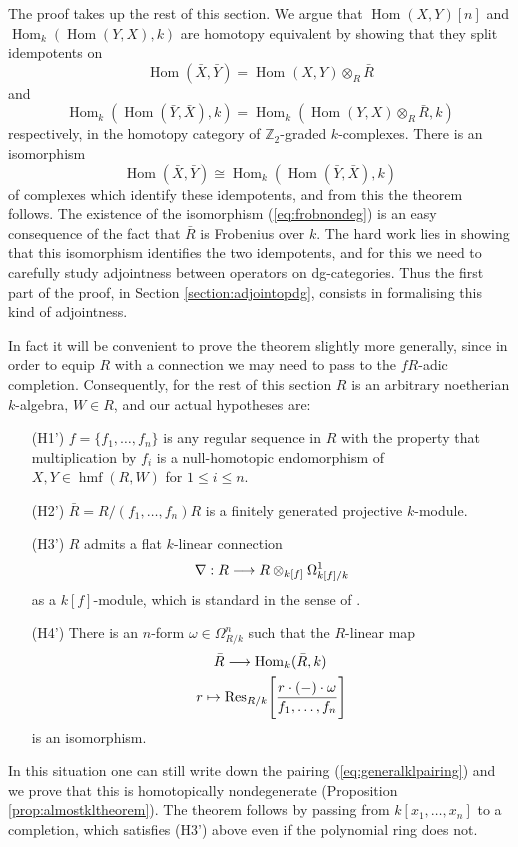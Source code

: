 \documentclass{compositio}
\theoremstyle{definition}
\newtheorem{remark}[theorem]{Remark}
\numberwithin{equation}{section}
\newcommand{\Ress}[1]{\res_{#1}\!}
\def\res{\operatorname{Res}}
\def\Hom{\operatorname{Hom}}
\DeclareMathOperator{\hmf}{hmf}
\begin{document}

The proof takes up the rest of this section. We argue that $\Hom(X,Y)[n]$ and $\Hom_k(\Hom(Y,X),k)$ are homotopy equivalent by showing that they split idempotents on
\[
\Hom(\bar{X},\bar{Y}) = \Hom(X,Y) \otimes_R \bar{R}
\]
and
\[
\Hom_k( \Hom(\bar{Y}, \bar{X}), k) = \Hom_k( \Hom(Y,X) \otimes_R \bar{R}, k )
\]
respectively, in the homotopy category of $\mathbb{Z}_2$-graded $k$-complexes. There is an isomorphism
\begin{equation}\label{eq:frobnondeg}
\Hom(\bar{X}, \bar{Y}) \cong \Hom_k( \Hom(\bar{Y}, \bar{X}), k)
\end{equation}
of complexes which identify these idempotents, and from this the theorem follows. The existence of the isomorphism (\ref{eq:frobnondeg}) is an easy consequence of the fact that $\bar{R}$ is Frobenius over $k$. The hard work lies in showing that this isomorphism identifies the two idempotents, and for this we need to carefully study adjointness between operators on dg-categories. Thus the first part of the proof, in Section \ref{section:adjointopdg}, consists in formalising this kind of adjointness.

In fact it will be convenient to prove the theorem slightly more generally, since in order to equip $R$ with a connection we may need to pass to the $fR$-adic completion. Consequently, for the rest of this section $R$ is an arbitrary noetherian $k$-algebra, $W \in R$, and our actual hypotheses are:
\begin{itemize}
\item[(H1')] $f = \{ f_1,\ldots,f_n \}$ is any regular sequence in $R$ with the property that multiplication by $f_i$ is a null-homotopic endomorphism of $X,Y \in \hmf(R,W)$ for $1 \le i \le n$.
\item[(H2')] $\bar{R} = R/(f_1,\ldots,f_n)R$ is a finitely generated projective $k$-module.
\item[(H3')] $R$ admits a flat $k$-linear connection
\[
\nabla: R \longrightarrow R \otimes_{k[f]} \Omega^1_{k[f]/k}
\]
as a $k[f]$-module, which is standard in the sense of \cite{??}.
\item[(H4')] There is an $n$-form $\omega \in \Omega^n_{R/k}$ such that the $R$-linear map
\begin{gather*}
\bar{R} \lto \Hom_k( \bar{R}, k)\,\\
r \mapsto \Ress{R/k}\Bigg[ \frac{r \cdot (-) \cdot \omega}{ f_1, \ldots, f_n} \Bigg]
\end{gather*}
is an isomorphism.
\end{itemize}
In this situation one can still write down the pairing (\ref{eq:generalklpairing}) and we prove that this is homotopically nondegenerate (Proposition \ref{prop:almostkltheorem}). The theorem follows by passing from $k[x_1,\ldots,x_n]$ to a completion, which satisfies (H3') above even if the polynomial ring does not.
\end{document}
